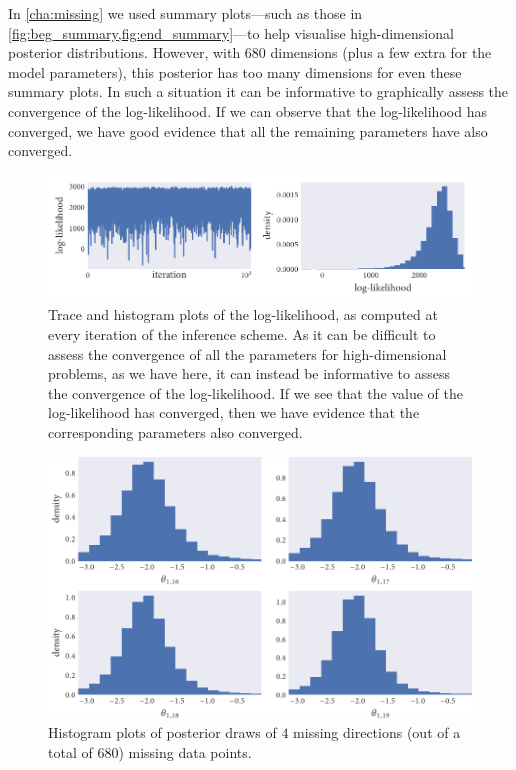 In \cref{cha:missing} we used summary plots---such as those in
\cref{fig:beg_summary,fig:end_summary}---to help visualise high-dimensional
posterior distributions. However, with $680$ dimensions (plus a few extra for
the model parameters), this posterior has too many dimensions for even these
summary plots. In such a situation it can be informative to graphically assess
the convergence of the log-likelihood. If we can observe that the
log-likelihood has converged, we have good evidence that all the remaining
parameters have also converged.

\begin{figure}[tb]
  \includegraphics{log_likelihood.pdf}
  \caption{Trace and histogram plots of the log-likelihood, as computed at
    every iteration of the inference scheme. As it can be difficult to assess
    the convergence of all the parameters for high-dimensional problems, as we have
    here, it can instead be informative to assess the convergence of the
    log-likelihood. If we see that the value of the log-likelihood has
    converged, then we have evidence that the corresponding parameters also
    converged.}
\end{figure}

\begin{figure}[tb]
  \includegraphics{dir_hist.pdf}
  \caption{Histogram plots of posterior draws of $4$ missing directions (out of
  a total of $680$) missing data points.}
  \label{fig:dir_hist}
\end{figure}

